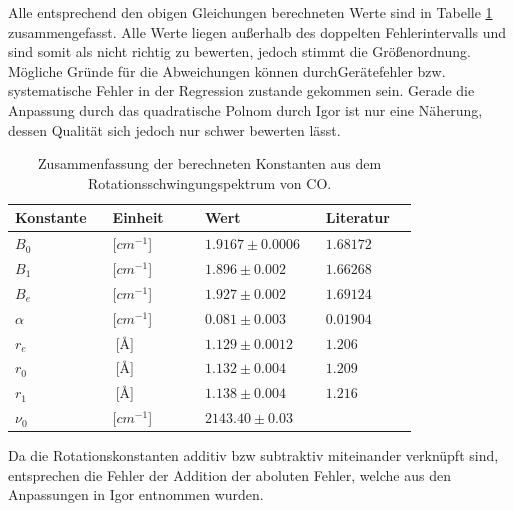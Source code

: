 Alle entsprechend den obigen Gleichungen berechneten Werte sind in Tabelle \ref{Zusammenfassung} zusammengefasst. Alle Werte liegen außerhalb des doppelten Fehlerintervalls und sind somit als nicht richtig zu bewerten, jedoch stimmt die Größenordnung. Mögliche Gründe für die Abweichungen können durchGerätefehler bzw. systematische Fehler in der Regression zustande gekommen sein. Gerade die Anpassung durch das quadratische Polnom durch Igor ist nur eine Näherung, dessen Qualität sich jedoch nur schwer bewerten lässt.

\begin{table}
\label{Zusammenfassung}
	\caption{Zusammenfassung der berechneten Konstanten aus dem Rotationsschwingungspektrum von CO.  }
\begin{tabular}{C{0.2\linewidth}|C{0.2\linewidth}|C{0.2\linewidth}|C{0.2\linewidth}}
Konstante             & Einheit                  & Wert                           & Literatur\cite{Lit} \\ \hline
$B_0$                  & [$cm^{-1}$]          & $1.9167 \pm 0.0006$	& $1.68172$   \\
$B_1$                  & [$cm^{-1}$]          & $1.896 \pm 0.002$   	& $1.66268$   \\
$B_e $                 & [$cm^{-1}$]          & $1.927 \pm 0.002$   	& $1.69124$   \\
$\alpha$		& [$cm^{-1}$]       & $0.081 \pm 0.003$   	& $0.01904$   \\
$r_e$                  & $\SI{}{[\angstrom]}$		& $1.129 \pm 0.0012 $  	& $1.206$     \\
$r_0$                  & $\SI{}{[\angstrom]} $		& $1.132 \pm 0.004$  	 & $1.209$     \\
$r_1$                  & $\SI{}{[\angstrom]}$ 		& $1.138 \pm 0.004$  	 & $1.216$    \\
$\nu_0$	&[$cm^{-1}$]          & $2143.40 \pm 0.03$&
\end{tabular}
\end{table}


Da die Rotationskonstanten additiv bzw subtraktiv miteinander verknüpft sind, entsprechen die Fehler der Addition der aboluten Fehler, welche aus den Anpassungen in Igor entnommen wurden. 



%

